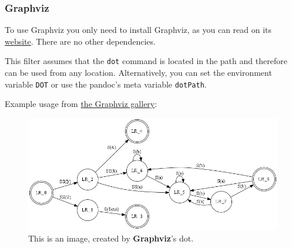 \documentclass[
  10pt,
]{book}
\begin{document}
\hypertarget{graphviz}{%
\subsubsection{Graphviz}\label{graphviz}}

To use Graphviz you only need to install Graphviz, as you can read on
its \href{http://www.graphviz.org/}{website}. There are no other
dependencies.

This filter assumes that the \texttt{dot} command is located in the path
and therefore can be used from any location. Alternatively, you can set
the environment variable \texttt{DOT} or use the pandoc's meta variable
\texttt{dotPath}.

Example usage from
\href{https://graphviz.gitlab.io/_pages/Gallery/directed/fsm.html}{the
Graphviz gallery}:

\begin{figure}
\centering
\includegraphics{./tex2pdf.-1f50f5654d7493c4/41a1b7e18b45d94e590ef40ebcf3e52f86f470d1.png}
\caption{This is an image, created by \textbf{Graphviz}'s dot.}
\end{figure}

\backmatter
\end{document}
